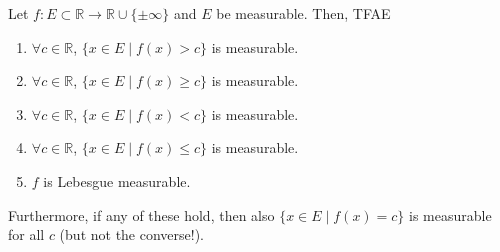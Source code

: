   \begin{theorem}
    Let $f: E \subset \mathbb{R} \to \mathbb{R} \cup \{ \pm \infty\}$ and $E$ be measurable. Then, TFAE 
    \begin{enumerate} 
      \item $\forall c \in \mathbb{R}$, $\{x \in E \mid f(x) > c\}$ is measurable. 
      \item $\forall c \in \mathbb{R}$, $\{x \in E \mid f(x) \geq c\}$ is measurable. 
      \item $\forall c \in \mathbb{R}$, $\{x \in E \mid f(x) < c\}$ is measurable. 
      \item $\forall c \in \mathbb{R}$, $\{x \in E \mid f(x) \leq c\}$ is measurable. 
      \item $f$ is Lebesgue measurable. 
    \end{enumerate}
    Furthermore, if any of these hold, then also $\{x \in E \mid f(x) = c \}$ is measurable for all $c$ (but not the converse!). 
  \end{theorem} 
